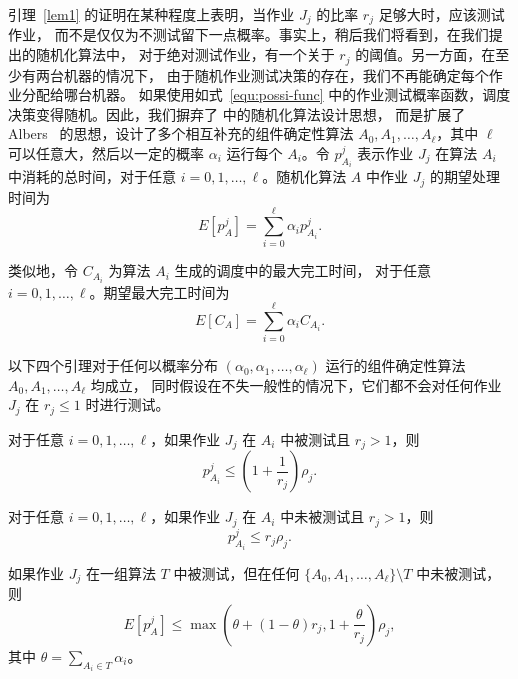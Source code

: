 引理~\ref{lem1} 的证明在某种程度上表明，当作业 \( J_j \) 的比率 \( r_j \) 足够大时，应该测试作业，
而不是仅仅为不测试留下一点概率。事实上，稍后我们将看到，在我们提出的随机化算法中，
对于绝对测试作业，有一个关于 \( r_j \) 的阈值。另一方面，在至少有两台机器的情况下，
由于随机作业测试决策的存在，我们不再能确定每个作业分配给哪台机器。
如果使用如式~\ref{equ:possi-func} 中的作业测试概率函数，调度决策变得随机。因此，我们摒弃了\cite{durr2018scheduling,durr2020adversarial,albers2021explorable} 中的随机化算法设计思想，
而是扩展了 Albers~\cite{albers2002randomized} 的思想，设计了多个相互补充的组件确定性算法 \( A_0, A_1, \dots, A_\ell \)，其中 \( \ell \) 可以任意大，然后以一定的概率 \( \alpha_i \) 运行每个 \( A_i \)。令 \( p_{A_i}^j \) 表示作业 \( J_j \) 在算法 \( A_i \) 中消耗的总时间，对于任意 \( i = 0, 1, \dots, \ell \)。随机化算法 \( A \) 中作业 \( J_j \) 的期望处理时间为
\begin{equation}
\label{equ:equ2}
E[p_A^j] = \sum_{i=0}^{\ell} \alpha_i p_{A_i}^j.
\end{equation}

类似地，令 \( C_{A_i} \) 为算法 \( A_i \) 生成的调度中的最大完工时间，
对于任意 \( i = 0, 1, \dots, \ell \)。期望最大完工时间为
\begin{equation}
\label{equ:equ3}
E[C_A] = \sum_{i=0}^{\ell} \alpha_i C_{A_i}.
\end{equation}

以下四个引理对于任何以概率分布 \( (\alpha_0, \alpha_1, \dots, \alpha_\ell) \) 
运行的组件确定性算法 \( A_0, A_1, \dots, A_\ell \) 均成立，
同时假设在不失一般性的情况下，它们都不会对任何作业 \( J_j \) 在 \( r_j \leq 1 \) 时进行测试。

\begin{lem}
\label{lem2}
对于任意 \( i = 0, 1, \dots, \ell \)，如果作业 \( J_j \) 在 \( A_i \) 中被测试且 \( r_j > 1 \)，则
\[
p_{A_i}^j \leq \left(1 + \frac{1}{r_j}\right) \rho_j.
\]
\end{lem}

\begin{lem}
\label{lem3}
对于任意 \( i = 0, 1, \dots, \ell \)，如果作业 \( J_j \) 在 \( A_i \) 中未被测试且 \( r_j > 1 \)，则
\[
p_{A_i}^j \leq r_j \rho_j.
\]
\end{lem}

\begin{lem}
\label{lem4}
如果作业 \( J_j \) 在一组算法 \( T \) 中被测试，但在任何 \( \{A_0, A_1, \dots, A_\ell\} \setminus T \) 中未被测试，则
\[
E[p_A^j] \leq \max \left( \theta + (1 - \theta) r_j, 1 + \frac{\theta}{r_j} \right) \rho_j,
\]
其中 \( \theta = \sum_{A_i \in T} \alpha_i \)。
\end{lem}

